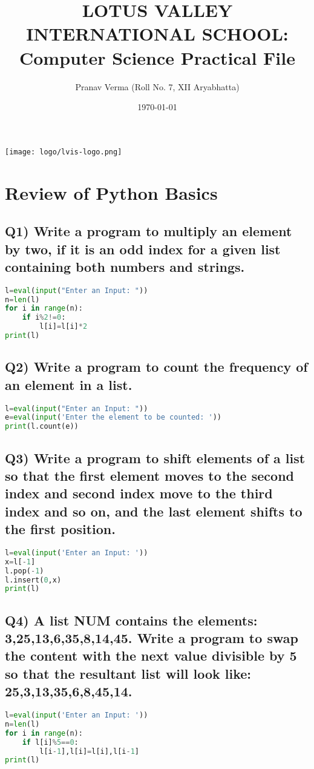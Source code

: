 \documentclass{article}
\title{LOTUS VALLEY INTERNATIONAL SCHOOL: Computer Science Practical File}
\author{Pranav Verma (Roll No. 7, XII Aryabhatta)}
\date{\today}
\begin{document}
\maketitle

\begin{center}
\texttt{[image: logo/lvis-logo.png]}
\end{center}

\vspace*{\fill}

\tableofcontents

\section{Review of Python Basics}

\subsection*{Q1) Write a program to multiply an element by two, if it is an odd index for a given list containing both numbers and strings.}
\begin{lstlisting}[language=Python]
l=eval(input("Enter an Input: "))
n=len(l)
for i in range(n):
    if i%2!=0:
        l[i]=l[i]*2
print(l)
\end{lstlisting}

\subsection*{Q2) Write a program to count the frequency of an element in a list.}
\begin{lstlisting}[language=Python]
l=eval(input("Enter an Input: "))
e=eval(input('Enter the element to be counted: '))
print(l.count(e))
\end{lstlisting}

\subsection*{Q3) Write a program to shift elements of a list so that the first element moves to the second index and second index move to the third index and so on, and the last element shifts to the first position.}
\begin{lstlisting}[language=Python]
l=eval(input('Enter an Input: '))
x=l[-1]
l.pop(-1)
l.insert(0,x)
print(l)
\end{lstlisting}

\subsection*{Q4) A list NUM contains the elements: 3,25,13,6,35,8,14,45. Write a program to swap the content with the next value divisible by 5 so that the resultant list will look like: 25,3,13,35,6,8,45,14.}
\begin{lstlisting}[language=Python]
l=eval(input('Enter an Input: '))
n=len(l)
for i in range(n):
    if l[i]%5==0:
        l[i-1],l[i]=l[i],l[i-1]
print(l)
\end{lstlisting}
\end{document}
